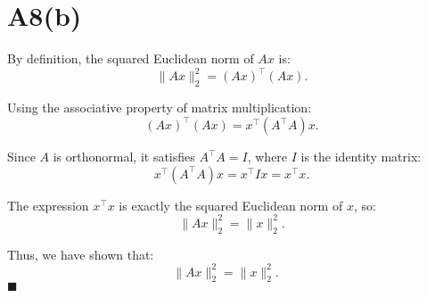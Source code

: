 \documentclass{article}
\begin{document}
\section*{A8(b)}

By definition, the squared Euclidean norm of \( A x \) is:
\[
\|A x\|_2^2 = (A x)^\top (A x).
\]

Using the associative property of matrix multiplication:
\[
(A x)^\top (A x) = x^\top (A^\top A) x.
\]

Since \( A \) is orthonormal, it satisfies \( A^\top A = I \), where \( I \) is the identity matrix:
\[
x^\top (A^\top A) x = x^\top I x = x^\top x.
\]

The expression \( x^\top x \) is exactly the squared Euclidean norm of \( x \), so:
\[
\|A x\|_2^2 = \|x\|_2^2.
\]

Thus, we have shown that:
\[
\|A x\|_2^2 = \|x\|_2^2. \quad
\]
\hfill\(\blacksquare\)
\end{document}
